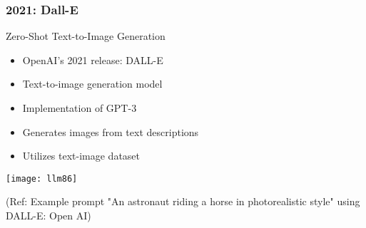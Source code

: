 




\begin{frame}[fragile]\frametitle{2021: Dall-E}

 Zero-Shot Text-to-Image Generation
 
\begin{itemize}
        \item OpenAI's 2021 release: DALL-E
        \item Text-to-image generation model
        \item Implementation of GPT-3
        \item Generates images from text descriptions
        \item Utilizes text-image dataset	
\end{itemize}	

\begin{center}
\texttt{[image: llm86]}
\end{center}		

{\tiny (Ref: Example prompt "An astronaut riding a horse in photorealistic style" using DALL-E: Open AI)}

\end{frame}

